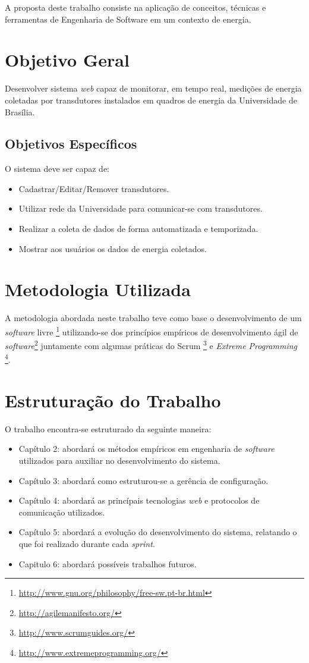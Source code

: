 A proposta deste trabalho consiste na aplicação de conceitos, técnicas e ferramentas de Engenharia de Software em um contexto de energia.

\section{Objetivo Geral}
Desenvolver sistema \textit{web} capaz de monitorar, em tempo real, medições de energia coletadas por transdutores
instalados em quadros de energia da Universidade de Brasília.

\subsection{Objetivos Específicos}
O sistema deve ser capaz de:
\begin{itemize}
    \item Cadastrar/Editar/Remover transdutores.
    \item Utilizar rede da Universidade para comunicar-se com transdutores.
    \item Realizar a coleta de dados de forma automatizada e temporizada.
    \item Mostrar aos usuários os dados de energia coletados.
\end{itemize}

\section{Metodologia Utilizada}
A metodologia abordada neste trabalho teve como base o desenvolvimento de um \textit{software} livre \footnote{\url{http://www.gnu.org/philosophy/free-sw.pt-br.html}} utilizando-se dos princípios empíricos de desenvolvimento ágil de \textit{software}\footnote{\url{http://agilemanifesto.org/}} juntamente com algumas práticas do Scrum \footnote{\url{http://www.scrumguides.org/}} e \textit{Extreme Programming} \footnote{\url{http://www.extremeprogramming.org/}}.

\section{Estruturação do Trabalho}
O trabalho encontra-se estruturado da seguinte maneira:

\begin{itemize}
    \item Capítulo 2: abordará os métodos empíricos em engenharia de \textit{software} utilizados para
    auxiliar no desenvolvimento do sistema.
    \item Capítulo 3: abordará como estruturou-se a gerência de configuração.
    \item Capítulo 4: abordará as princípais tecnologias \textit{web} e protocolos de comunicação utilizados.
    \item Capítulo 5: abordará a evolução do desenvolvimento do sistema, relatando o que foi realizado durante cada \textit{sprint}.
    \item Capitulo 6: abordará possíveis trabalhos futuros.
\end{itemize}
